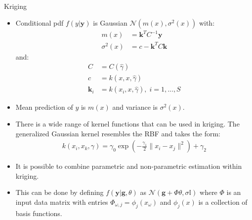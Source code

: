 \documentclass[handout,9pt]{beamer}
\begin{document}
\begin{frame}{Kriging}

\begin{itemize}
   \setlength{\itemsep}{10pt}
\item Conditional pdf $f(y|\mathbf{y})$ is Gaussian $\mathcal{N}(m(x),\sigma^2(x))$ with:
\begin{align*}
m(x)&=\mathbf{k}^TC^{-1}\mathbf{y}\\
\sigma^2(x)&=c-\mathbf{k}^TC\mathbf{k}
\end{align*}
and:
\begin{align*}
C&=C(\hat{\gamma})\\
c&=k(x,x,\hat{\gamma})\\
\mathbf{k}_i&=k(x_i,x,\hat{\gamma}),\; i=1,...,S
\end{align*}
\item Mean prediction of $y$ is $m(x)$ and variance is $\sigma^2(x)$.
\item There is a wide range of kernel functions that can be used in kriging. The generalized Gaussian kernel resembles the RBF and takes the form:
\begin{align*}
k(x_i,x_k,\gamma)=\gamma_0\exp\left(-\frac{\gamma_1}{2}\|x_i-x_j\|^2\right)+\gamma_2
\end{align*}
\item It is possible to combine parametric and non-parametric estimation within kriging. 
\item This can be done by defining $f(\mathbf{y}|\mathbf{g},\theta)$ as $\mathcal{N}(\mathbf{g}+\Phi\theta,\sigma \mathbb{I})$ where $\Phi$ is an input data matrix with entries $\Phi_{\omega,j}=\phi_j(x_\omega)$ and $\phi_j(x)$ is a collection of basis functions. 

\end{itemize}

\end{frame}
\end{document}
